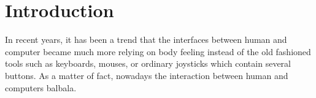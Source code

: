 \chapter{Introduction}
\label{c:intro}


In recent years, it has been a trend that the interfaces between human and computer became much more relying on body feeling instead of the old fashioned tools such as keyboards, mouses, or ordinary joysticks which contain several buttons. As a matter of fact, nowadays the interaction between human and computers
balbala. 

